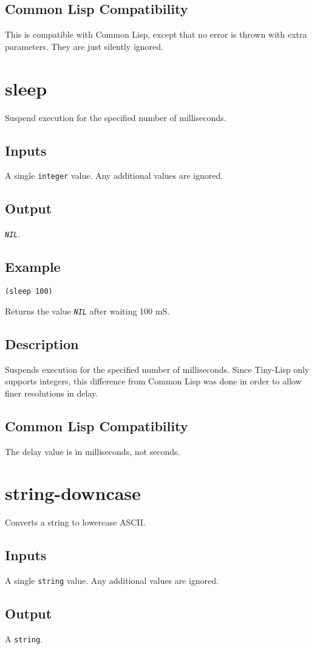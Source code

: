 \documentclass[10pt, openany]{book}
\newcommand{\constant}[1]{\emph{\texttt{#1}}}
\newcommand{\datatype}[1]{\texttt{#1}}
\newcommand{\tl}{Tiny-Lisp}
\newcommand{\cl}{Common Lisp}
\begin{document}
\subsection{Common Lisp Compatibility}
This is compatible with \cl, except that no error is thrown with extra parameters.  They are just silently ignored.

\section{sleep}
Suspend execution for the specified number of milliseconds.
\subsection{Inputs}
A single \datatype{integer} value.  Any additional values are ignored.
\subsection{Output}
\constant{NIL}.
\subsection{Example}
\begin{lstlisting}
(sleep 100)
\end{lstlisting}
Returns the value \constant{NIL} after waiting 100 mS.
\subsection{Description}
Suspends execution for the specified number of milliseconds.  Since \tl{} only supports integers, this difference from \cl{} was done in order to allow finer resolutions in delay.
\subsection{Common Lisp Compatibility}
The delay value is in milliseconds, not seconds.

\section{string-downcase}
Converts a string to lowercase ASCII.
\subsection{Inputs}
A single \datatype{string} value.  Any additional values are ignored.
\subsection{Output}
A \datatype{string}.
\end{document}
